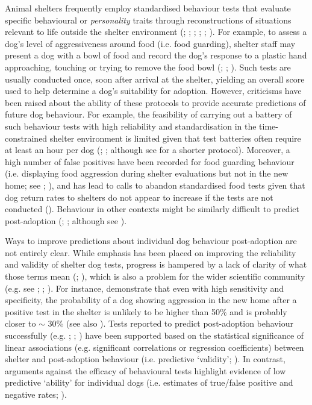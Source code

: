\documentclass[12pt]{article}
\begin{document}
Animal shelters frequently employ standardised behaviour tests that evaluate specific behavioural or \textit{personality} traits through reconstructions of situations relevant to life outside the shelter environment (\cite{vanderborg1991}; \cite{marston2003}; \cite{mornement2010}; \cite{taylor2006}; \cite{rayment2015}; \cite{clay2020behaviour}). For example, to assess a dog's level of aggressiveness around food (i.e. food guarding), shelter staff may present a dog with a bowl of food and record the dog's response to a plastic hand approaching, touching or trying to remove the food bowl (\cite{mohangibbons2012}; \cite{mohangibbons2018}; \cite{marder2013}). Such tests are usually conducted once, soon after arrival at the shelter, yielding an overall score used to help determine a dog's suitability for adoption. However, criticisms have been raised about the ability of these protocols to provide accurate predictions of future dog behaviour. For example, the feasibility of carrying out a battery of such behaviour tests with high reliability and standardisation in the time-constrained shelter environment is limited given that test batteries often require at least an hour per dog (\cite{vanderborg1991}; \cite{mornement2009}; although see \textcite{poulsen2010} for a shorter protocol). Moreover, a high number of false positives have been recorded for food guarding behaviour (i.e. displaying food aggression during shelter evaluations but not in the new home; see \cite{mohangibbons2012}; \cite{marder2013}), and has lead to calls to abandon standardised food tests given that dog return rates to shelters do not appear to increase if the tests are not conducted (\cite{mohangibbons2018}). Behaviour in other contexts might be similarly difficult to predict post-adoption (\cite{christensen2007}; \cite{mornement2015}; although see \textcite{bollen2008}).

Ways to improve predictions about individual dog behaviour post-adoption are not entirely clear. While emphasis has been placed on improving the reliability and validity of shelter dog tests, progress is hampered by a lack of clarity of what those terms mean (\cite{patronek2019}; \cite{rayment2015}), which is also a problem for the wider scientific community (e.g. see \cite{borsboom2004}; \cite{borsboom2009}; \cite{maul2016}). For instance, \textcite{patbrad2016} demonstrate that even with high sensitivity and specificity, the probability of a dog showing aggression in the new home after a positive test in the shelter is unlikely to be higher than 50\% and is probably closer to $\sim$ 30\% (see also \cite{patronek2019}). Tests reported to predict post-adoption behaviour successfully (e.g. \cite{valsecchi2011}; \cite{poulsen2010}; \cite{bollen2008}) have been supported based on the statistical significance of linear associations (e.g. significant correlations or regression coefficients) between shelter and post-adoption behaviour (i.e. predictive `validity'; \cite{patronek2019}). In contrast, arguments against the efficacy of behavioural tests highlight evidence of low predictive `ability' for individual dogs (i.e. estimates of true/false positive and negative rates; \cite{patronek2019}).
\end{document}
